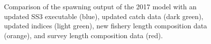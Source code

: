 \documentclass[
]{scrartcl}
\begin{document}
\clearpage

\begin{figure}


\caption{\label{fig-newdata_1}Comparison of the spawning output of the
2017 model with an updated SS3 executable (blue), updated catch data
(dark green), updated indices (light green), new fishery length
composition data (orange), and survey length composition data (red).}

\end{figure}%
\end{document}
